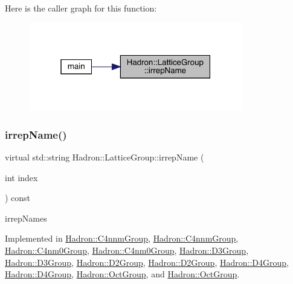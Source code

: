 Here is the caller graph for this function\+:\nopagebreak
\begin{figure}[H]
\begin{center}
\leavevmode
\includegraphics[width=265pt]{dd/d2e/structHadron_1_1LatticeGroup_a4bc5620218c2a73157e19bc4451fe746_icgraph}
\end{center}
\end{figure}
\mbox{\label{structHadron_1_1LatticeGroup_a4bc5620218c2a73157e19bc4451fe746}} 
\subsubsection{\texorpdfstring{irrepName()}{irrepName()}\hspace{0.1cm}{\footnotesize\ttfamily [2/2]}}
{\footnotesize\ttfamily virtual std\+::string Hadron\+::\+Lattice\+Group\+::irrep\+Name (\begin{DoxyParamCaption}\item[{int}]{index }\end{DoxyParamCaption}) const\hspace{0.3cm}{\ttfamily [pure virtual]}}

irrep\+Names 

Implemented in \mbox{\hyperlink{structHadron_1_1C4nnmGroup_ac2b3ee6989ddbd93bc63c46ac9626997}{Hadron\+::\+C4nnm\+Group}}, \mbox{\hyperlink{structHadron_1_1C4nnmGroup_ac2b3ee6989ddbd93bc63c46ac9626997}{Hadron\+::\+C4nnm\+Group}}, \mbox{\hyperlink{structHadron_1_1C4nm0Group_ae7e7c420d17cacaed69a74902af72dcc}{Hadron\+::\+C4nm0\+Group}}, \mbox{\hyperlink{structHadron_1_1C4nm0Group_ae7e7c420d17cacaed69a74902af72dcc}{Hadron\+::\+C4nm0\+Group}}, \mbox{\hyperlink{structHadron_1_1D3Group_a3e60ca3001ddc0176179107cfed2d621}{Hadron\+::\+D3\+Group}}, \mbox{\hyperlink{structHadron_1_1D3Group_a3e60ca3001ddc0176179107cfed2d621}{Hadron\+::\+D3\+Group}}, \mbox{\hyperlink{structHadron_1_1D2Group_a502111e32a238c50b248b9f7b0625385}{Hadron\+::\+D2\+Group}}, \mbox{\hyperlink{structHadron_1_1D2Group_a502111e32a238c50b248b9f7b0625385}{Hadron\+::\+D2\+Group}}, \mbox{\hyperlink{structHadron_1_1D4Group_a5f121bd08a7add3ddf660c7e3478cb9e}{Hadron\+::\+D4\+Group}}, \mbox{\hyperlink{structHadron_1_1D4Group_a5f121bd08a7add3ddf660c7e3478cb9e}{Hadron\+::\+D4\+Group}}, \mbox{\hyperlink{structHadron_1_1OctGroup_a58f84ff32d1dce2277f3b9da9d35d594}{Hadron\+::\+Oct\+Group}}, and \mbox{\hyperlink{structHadron_1_1OctGroup_a58f84ff32d1dce2277f3b9da9d35d594}{Hadron\+::\+Oct\+Group}}.

